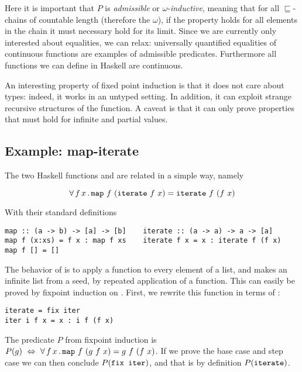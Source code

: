 Here it is important that $P$ is \emph{admissible} or
$\omega$-\emph{inductive}, meaning that for all $\sqsubseteq$-chains
of countable length (therefore the $\omega$), if the property holds
for all elements in the chain it must necessary hold for its limit.
Since we are currently only interested about equalities, we can relax:
universally quantified equalities of continuous functions are examples
of admissible predicates. Furthermore all functions we can define in
Haskell are continuous.

An interesting property of fixed point induction is that it does not
care about types: indeed, it works in an untyped setting. In addition,
it can exploit strange recursive structures of the function. A caveat
is that it can only prove properties that must hold for infinite and
partial values.

\subsection{Example: map-iterate}

The two Haskell functions  and  are related in a
simple way, namely

\begin{equation*}
\faa{f}{x} \hs{map} \w f \w (\hs{iterate} \w f \w x) \eq
           \hs{iterate} \w f \w (f \w x)
\end{equation*}

With their standard definitions

\begin{verbatim}
map :: (a -> b) -> [a] -> [b]    iterate :: (a -> a) -> a -> [a]
map f (x:xs) = f x : map f xs    iterate f x = x : iterate f (f x)
map f [] = []
\end{verbatim}

The behavior of  is to apply a function to every element of a
list, and  makes an infinite list from a seed, by repeated
application of a function. This can easily be proved by fixpoint
induction on . First, we rewrite this function in terms of
:

\begin{verbatim}
iterate = fix iter
iter i f x = x : i f (f x)
\end{verbatim}

The predicate $P$ from fixpoint induction is $P(g) \w \Leftrightarrow
\w \faa{f}{x} \hs{map} \w f \w (g \w f \w x) \eq g \w f \w (f \w x) $. If we
prove the base case and step case we can then conclude
$P(\hs{fix iter})$, and that is by definition $P(\hs{iterate})$.

